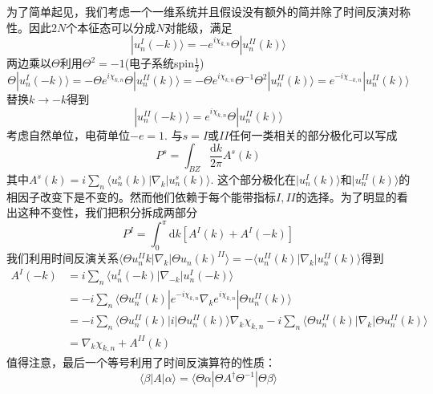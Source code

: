 \documentclass{article}
\numberwithin{equation}{subsection}
\begin{document}
为了简单起见，我们考虑一个一维系统并且假设没有额外的简并除了时间反演对称性。因此$2N$个本征态可以分成$N$对能级，满足
\begin{equation}
    |u_n^I(-k)\rangle=-e^{i\chi_{k,n}}\Theta|u_n^{II}(k)\rangle
\end{equation}
两边乘以$\Theta$利用$\Theta^2=-1$(电子系统spin$\frac{1}{2}$)
\begin{equation}
    \Theta|u_n^I(-k)\rangle=-\Theta e^{i\chi_{k,n}}\Theta|u_n^{II}(k)\rangle=-\Theta e^{i\chi_{k,n}}\Theta^{-1}\Theta^2|u_n^{II}(k)\rangle=e^{-i\chi_{-k,n}}|u_n^{II}(k)\rangle
\end{equation}
替换$k\rightarrow -k$得到
\begin{equation}
    |u_n^{II}(-k)\rangle=e^{i\chi_{k,n}}\Theta|u_n^{II}(k)\rangle
\end{equation}
考虑自然单位，电荷单位$-e=1$. 与$s = I$或$II$任何一类相关的部分极化可以写成
\begin{equation}
    P^s=\int_{BZ}\frac{\mathrm{d}k}{2\pi}A^s(k)
\end{equation}
其中$A^s(k)=i\sum_{n}\langle u_n^s(k)|\nabla_k|u_n^s(k)\rangle$. 这个部分极化在$|u_n^I(k)\rangle$和$|u_n^{II}(k)\rangle$的相因子改变下是不变的。然而他们依赖于每个能带指标$I,II$的选择。为了明显的看出这种不变性，我们把积分拆成两部分
\begin{equation}
    P^I=\int_{0}^{\pi}\mathrm{d}k[A^I(k)+A^{I}(-k)]
\end{equation}
我们利用时间反演关系$\langle\Theta u_n^{II}{k}|\nabla_k|\Theta u_{n}(k)^{II}\rangle=-\langle u_n^{II}(k)|\nabla_k|u_n^{II}(k)\rangle$得到
\begin{equation}
    \begin{split}
        A^I(-k)&=i\sum_{n}\langle u_n^I(-k)|\nabla_{-k}|u_n^I(-k)\rangle\\
        &=-i\sum_{n}\langle \Theta u_n^{II}(k)|e^{-i\chi_{k,n}}\nabla_k e^{i\chi_{k,n}}|\Theta u_{n}^{II}(k)\rangle\\
        &=-i\sum_{n}\langle\Theta u_{n}^{II}(k)|i|\Theta u_{n}^{II}(k)\rangle\nabla_k\chi_{k,n}-i\sum_{n}\langle\Theta u_{n}^{II}(k)|\nabla_k|\Theta u_n^{II}(k)\rangle\\
        &=\nabla_k\chi_{k,n}+A^{II}(k)
    \end{split}
\end{equation}
值得注意，最后一个等号利用了时间反演算符的性质：
\begin{equation}
    \langle \beta|A|\alpha\rangle=\langle\Theta\alpha|\Theta A^\dagger\Theta^{-1}|\Theta\beta\rangle
\end{equation}
\end{document}
